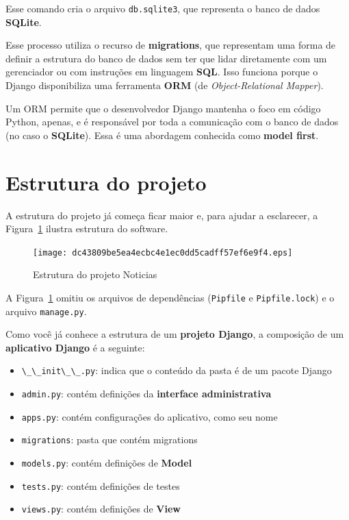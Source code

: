 \documentclass[brazil,a4paper,oneside,openright,parskip=full]{book}
\newcommand{\passthrough}[1]{#1}
\providecommand{\tightlist}{%
  \setlength{\itemsep}{0pt}\setlength{\parskip}{0pt}}
\begin{document}
Esse comando cria o arquivo \passthrough{\lstinline!db.sqlite3!}, que
representa o banco de dados \textbf{SQLite}.

Esse processo utiliza o recurso de \textbf{migrations}, que representam
uma forma de definir a estrutura do banco de dados sem ter que lidar
diretamente com um gerenciador ou com instruções em linguagem
\textbf{SQL}. Isso funciona porque o Django disponibiliza uma ferramenta
\textbf{ORM} (de \emph{Object-Relational Mapper}).

Um ORM permite que o desenvolvedor Django mantenha o foco em código
Python, apenas, e é responsável por toda a comunicação com o banco de
dados (no caso o \textbf{SQLite}). Essa é uma abordagem conhecida como
\textbf{model first}.

\hypertarget{estrutura-do-projeto}{%
\section{Estrutura do projeto}\label{estrutura-do-projeto}}

A estrutura do projeto já começa ficar maior e, para ajudar a
esclarecer, a Figura~\ref{fig:estrutura-noticias} ilustra estrutura do
software.

\begin{figure}
\hypertarget{fig:estrutura-noticias}{%
\centering
\texttt{[image: dc43809be5ea4ecbc4e1ec0dd5cadff57ef6e9f4.eps]}
\caption{Estrutura do projeto
Noticias\label{fig:estrutura-noticias}}\label{fig:estrutura-noticias}
}
\end{figure}

A Figura~\ref{fig:estrutura-noticias} omitiu os arquivos de dependências
(\passthrough{\lstinline!Pipfile!} e
\passthrough{\lstinline!Pipfile.lock!}) e o arquivo
\passthrough{\lstinline!manage.py!}.

Como você já conhece a estrutura de um \textbf{projeto Django}, a
composição de um \textbf{aplicativo Django} é a seguinte:

\begin{itemize}
\tightlist
\item
  \passthrough{\lstinline!\_\_init\_\_.py!}: indica que o conteúdo da
  pasta é de um pacote Django
\item
  \passthrough{\lstinline!admin.py!}: contém definições da
  \textbf{interface administrativa}
\item
  \passthrough{\lstinline!apps.py!}: contém configurações do aplicativo,
  como seu nome
\item
  \passthrough{\lstinline!migrations!}: pasta que contém migrations
\item
  \passthrough{\lstinline!models.py!}: contém definições de
  \textbf{Model}
\item
  \passthrough{\lstinline!tests.py!}: contém definições de testes
\item
  \passthrough{\lstinline!views.py!}: contém definições de \textbf{View}
\end{itemize}
\end{document}
